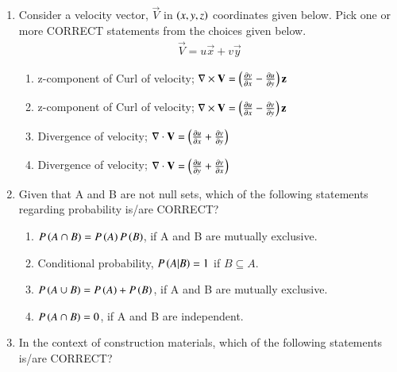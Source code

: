 \documentclass[journal,12pt,onecolumn]{article}
\theoremstyle{remark}
\begin{document}
\begin{enumerate}
    \item Consider a velocity vector, $\vec{V}$ in $\left(x, y, z\right)$ coordinates given below. Pick one or more CORRECT statements from the choices given below.
    \begin{align} \vec{V} = u\vec{x} + v\vec{y} \end{align}

    \hfill{}
    \begin{enumerate}
        \item z-component of Curl of velocity; $\nabla \times \mathbf{V} = \left(\frac{\partial v}{\partial x} - \frac{\partial u}{\partial y}\right)\mathbf{z}$
        \item z-component of Curl of velocity; $\nabla \times \mathbf{V} = \left(\frac{\partial u}{\partial x} - \frac{\partial v}{\partial y}\right)\mathbf{z}$
        \item Divergence of velocity; $\nabla \cdot \mathbf{V} = \left(\frac{\partial u}{\partial x} + \frac{\partial v}{\partial y}\right)$
        \item Divergence of velocity; $\nabla \cdot \mathbf{V} = \left(\frac{\partial u}{\partial y} + \frac{\partial v}{\partial x}\right)$
    \end{enumerate}

    \item Given that A and B are not null sets, which of the following statements regarding probability is/are CORRECT?

    \hfill{}
    \begin{enumerate}
        \item $P\left(A \cap B\right) = P\left(A\right) P\left(B\right)$, if A and B are mutually exclusive.
        \item Conditional probability, $P\left(A|B\right) = 1$ if $B \subseteq A$.
        \item $P\left(A \cup B\right) = P\left(A\right) + P\left(B\right)$, if A and B are mutually exclusive.
        \item $P\left(A \cap B\right) = 0$, if A and B are independent.
    \end{enumerate}

    \item In the context of construction materials, which of the following statements is/are CORRECT?


\end{enumerate}
\end{document}

